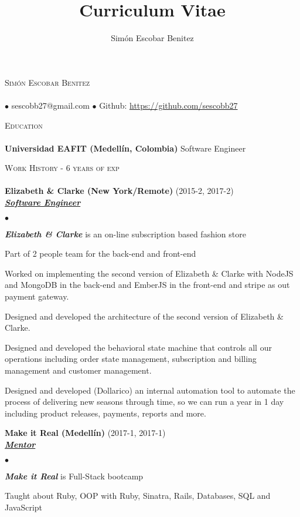 \documentclass[a4paper]{article}
\title{Curriculum Vitae}
\author{Sim\'on Escobar Benitez}
\newcommand{\lineunder}{\vspace*{-8pt} \\ \hspace*{-18pt} \hrulefill \\}
\newcommand{\header}[1]{{\hspace*{-15pt}\vspace*{6pt}
\textsc{#1}} \vspace*{-6pt} \lineunder}
\newcommand{\employer}[3]{{
\textbf{#1} (#2)\\ \underline{\textbf{\emph{#3}}}\\ }}
\newcommand{\contact}[2]{
\vspace*{-8pt}
\begin{center}
{\LARGE \scshape {#1}} \lineunder #2
\end{center}
\vspace*{-8pt} }
\newenvironment{achievements}{\begin{list}{$\bullet$}{\topsep 0pt \itemsep
-2pt}}{\vspace*{4pt}\end{list}}
\newcommand{\schoolwithcourses}[2]{
\textbf{#1} #2
\vspace*{5pt} }
\newcommand{\emphasys}[1]{\textbf{\emph{#1}}}
\begin{document}
\small
\smallskip
\vspace*{-44pt}
\contact{Sim\'on Escobar Benitez} { $\bullet$ sescobb27@gmail.com $\bullet$ Github: \url{https://github.com/sescobb27} }
\header{Education}
\schoolwithcourses{Universidad EAFIT (Medell\'in, Colombia)}{Software Engineer}

\header{Work History - 6 years of exp}

\employer{ Elizabeth \& Clarke (New York/Remote)}{2015-2, 2017-2}{Software Engineer}
\begin{achievements}
\item \emphasys{Elizabeth \& Clarke} is an on-line subscription based fashion store
\item Part of 2 people team for the back-end and front-end
\item Worked on implementing the second version of Elizabeth \& Clarke with NodeJS and MongoDB in the back-end and EmberJS in the front-end and stripe as out payment gateway.
\item Designed and developed the architecture of the second version of Elizabeth \& Clarke.
\item Designed and developed the behavioral state machine that controls all our operations including order state management, subscription and billing management and customer management.
\item Designed and developed (Dollarico) an internal automation tool to automate the process of delivering new seasons through time, so we can run a year in 1 day including product releases, payments, reports and more.
\end{achievements}

\employer{Make it Real (Medell\'in)}{2017-1, 2017-1}{Mentor}
\begin{achievements}
\item \emphasys{Make it Real} is Full-Stack bootcamp
\item Taught about Ruby, OOP with Ruby, Sinatra, Rails, Databases, SQL and JavaScript
\end{achievements}
\end{document}
